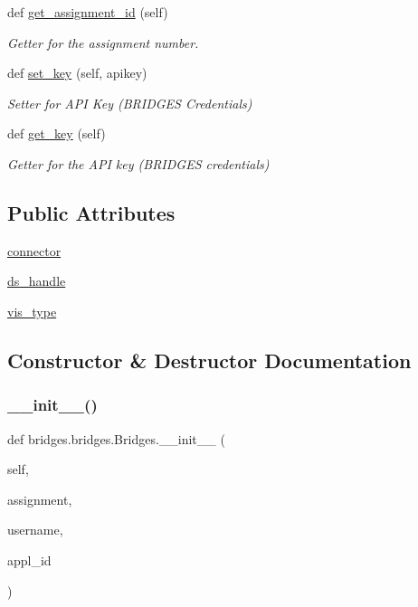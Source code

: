 \begin{DoxyCompactItemize}
def \mbox{\hyperlink{classbridges_1_1bridges_1_1_bridges_a94f39f11368031ad33800aac0bac2f7d}{get\+\_\+assignment\+\_\+id}} (self)
\begin{DoxyCompactList}\small\item\em Getter for the assignment number. \end{DoxyCompactList}\item 
def \mbox{\hyperlink{classbridges_1_1bridges_1_1_bridges_a5841bc54e3663249e76f4b34f5a3a593}{set\+\_\+key}} (self, apikey)
\begin{DoxyCompactList}\small\item\em Setter for A\+PI Key (B\+R\+I\+D\+G\+ES Credentials) \end{DoxyCompactList}\item 
def \mbox{\hyperlink{classbridges_1_1bridges_1_1_bridges_afcdb0291c535b41fb7be31eaf5bf3677}{get\+\_\+key}} (self)
\begin{DoxyCompactList}\small\item\em Getter for the A\+PI key (B\+R\+I\+D\+G\+ES credentials) \end{DoxyCompactList}\end{DoxyCompactItemize}
\subsection*{Public Attributes}
\begin{DoxyCompactItemize}
\item 
\mbox{\hyperlink{classbridges_1_1bridges_1_1_bridges_a1c02ee44e7a4a3ee2f7d9c7d7da7d09f}{connector}}
\item 
\mbox{\hyperlink{classbridges_1_1bridges_1_1_bridges_a7a6f25612be64d4f3e203d7d37cb4da4}{ds\+\_\+handle}}
\item 
\mbox{\hyperlink{classbridges_1_1bridges_1_1_bridges_a5ca152bf3830e2be1f72247463916f82}{vis\+\_\+type}}
\end{DoxyCompactItemize}


\subsection{Constructor \& Destructor Documentation}
\mbox{\label{classbridges_1_1bridges_1_1_bridges_af174072883f6f269a9fe7cc02e12c276}} 
\subsubsection{\texorpdfstring{\_\_init\_\_()}{\_\_init\_\_()}}
{\footnotesize\ttfamily def bridges.\+bridges.\+Bridges.\+\_\+\+\_\+init\+\_\+\+\_\+ (\begin{DoxyParamCaption}\item[{}]{self,  }\item[{}]{assignment,  }\item[{}]{username,  }\item[{}]{appl\+\_\+id }\end{DoxyParamCaption})}



